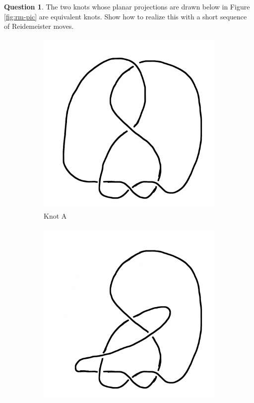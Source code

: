 \documentclass[12pt,letterpaper]{article}
\theoremstyle{definition}
\newtheorem{question}{Question}
\begin{document}
\begin{question}
The two knots whose planar projections are drawn below in Figure \ref{fig:rm-pic} are equivalent knots. Show how to realize this with a short sequence of Reidemeister moves.
\begin{figure}[h!]
    \centering
    \begin{subfigure}{.3\textwidth}
        \centering
        \includegraphics[width=\textwidth]{rgp06pics/exercise2-1.png}
        \caption{Knot A}
    \end{subfigure}
    \hspace{1cm}
    \begin{subfigure}{.3\textwidth}
        \centering
        \includegraphics[width=\textwidth]{rgp06pics/exercise2-2.png}

\end{subfigure}
\end{figure}
\end{question}
\end{document}
